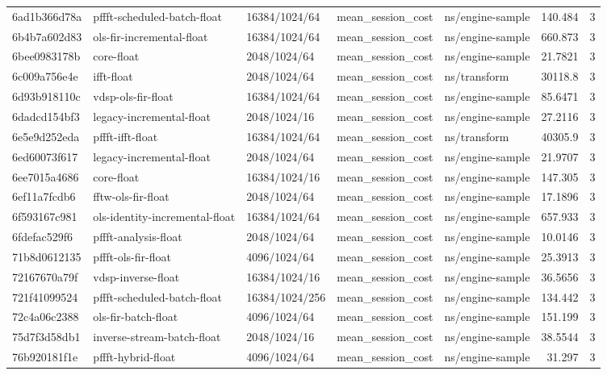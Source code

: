 \begin{longtable}{lllllrr}
6ad1b366d78a & pffft-scheduled-batch-float & 16384/1024/64 & mean\_session\_cost & ns/engine-sample & 140.484 & 3 \\
6b4b7a602d83 & ols-fir-incremental-float & 16384/1024/64 & mean\_session\_cost & ns/engine-sample & 660.873 & 3 \\
6bee0983178b & core-float & 2048/1024/64 & mean\_session\_cost & ns/engine-sample & 21.7821 & 3 \\
6c009a756e4e & ifft-float & 2048/1024/64 & mean\_session\_cost & ns/transform & 30118.8 & 3 \\
6d93b918110c & vdsp-ols-fir-float & 16384/1024/64 & mean\_session\_cost & ns/engine-sample & 85.6471 & 3 \\
6dadcd154bf3 & legacy-incremental-float & 2048/1024/16 & mean\_session\_cost & ns/engine-sample & 27.2116 & 3 \\
6e5e9d252eda & pffft-ifft-float & 16384/1024/64 & mean\_session\_cost & ns/transform & 40305.9 & 3 \\
6ed60073f617 & legacy-incremental-float & 2048/1024/64 & mean\_session\_cost & ns/engine-sample & 21.9707 & 3 \\
6ee7015a4686 & core-float & 16384/1024/16 & mean\_session\_cost & ns/engine-sample & 147.305 & 3 \\
6ef11a7fcdb6 & fftw-ols-fir-float & 2048/1024/64 & mean\_session\_cost & ns/engine-sample & 17.1896 & 3 \\
6f593167c981 & ols-identity-incremental-float & 16384/1024/64 & mean\_session\_cost & ns/engine-sample & 657.933 & 3 \\
6fdefac529f6 & pffft-analysis-float & 2048/1024/64 & mean\_session\_cost & ns/engine-sample & 10.0146 & 3 \\
71b8d0612135 & pffft-ols-fir-float & 4096/1024/64 & mean\_session\_cost & ns/engine-sample & 25.3913 & 3 \\
72167670a79f & vdsp-inverse-float & 16384/1024/16 & mean\_session\_cost & ns/engine-sample & 36.5656 & 3 \\
721f41099524 & pffft-scheduled-batch-float & 16384/1024/256 & mean\_session\_cost & ns/engine-sample & 134.442 & 3 \\
72c4a06c2388 & ols-fir-batch-float & 4096/1024/64 & mean\_session\_cost & ns/engine-sample & 151.199 & 3 \\
75d7f3d58db1 & inverse-stream-batch-float & 2048/1024/16 & mean\_session\_cost & ns/engine-sample & 38.5544 & 3 \\
76b920181f1e & pffft-hybrid-float & 4096/1024/64 & mean\_session\_cost & ns/engine-sample & 31.297 & 3 \\

\end{longtable}

